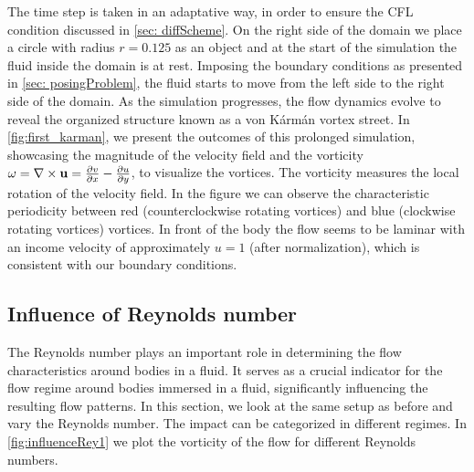 The time step is taken in an adaptative way, in order to ensure the CFL condition discussed in \cref{sec: diffScheme}. On the right side of the domain we place a circle with radius $r = 0.125$ as an object and at the start of the simulation the fluid inside the domain is at rest. Imposing the boundary conditions as presented in \cref{sec: posingProblem}, the fluid starts to move from the left side to the right side of the domain.
As the simulation progresses, the flow dynamics evolve to reveal the organized structure known as a von Kármán vortex street. In \cref{fig:first_karman}, we present the outcomes of this prolonged simulation, showcasing the magnitude of the velocity field and the vorticity $ \omega=\nabla \times \boldsymbol{\mathrm{u}} = \frac{\partial v}{\partial x} - \frac{\partial u}{\partial y}$, to visualize the vortices. The vorticity measures the local rotation of the velocity field. In the figure we can observe the characteristic periodicity between red (counterclockwise rotating vortices) and blue (clockwise rotating vortices) vortices. In front of the body the flow seems to be laminar with an income velocity of approximately $u = 1$ (after normalization), which is consistent with our boundary conditions.



\subsection{Influence of Reynolds number}
The Reynolds number plays an important role in determining the flow characteristics around bodies in a fluid. It serves as a crucial indicator for the flow regime around bodies immersed in a fluid, significantly influencing the resulting flow patterns. In this section, we look at the same setup as before and vary the Reynolds number. The impact can be categorized in different regimes. In \cref{fig:influenceRey1} we plot the vorticity of the flow for different Reynolds numbers. 

